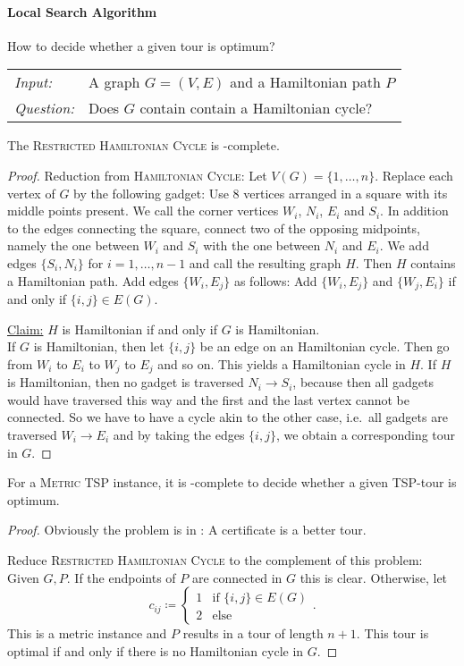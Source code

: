 \documentclass[../skript.tex]{subfiles}
\begin{document}
\paragraph{Local Search Algorithm}
How to decide whether a given tour is optimum?
\begin{problem}
\begin{tabular}{@{}ll}
\textit{Input:} & A graph $G = (V, E)$ and a Hamiltonian path $P$ \\
\textit{Question:} & Does $G$ contain contain a Hamiltonian cycle?
\end{tabular}
\end{problem}
\begin{theorem} %
\label{thm:90}
The \textsc{Restricted Hamiltonian Cycle} is \NP-complete.
\end{theorem}
\begin{proof}
Reduction from \textsc{Hamiltonian Cycle}: Let $V(G) = \{ 1, \ldots, n\}$. Replace each vertex of $G$ by the following gadget: Use 8 vertices arranged in a square with its middle points present. We call the corner vertices $W_i$, $N_i$, $E_i$ and $S_i$. In addition to the edges connecting the square, connect two of the opposing midpoints, namely the one between $W_i$ and $S_i$ with the one between $N_i$ and $E_i$. We add edges $\{ S_i, N_i \}$ for $i = 1, \ldots, n - 1$ and call the resulting graph $H$. Then $H$ contains a Hamiltonian path.
Add edges $\{ W_i, E_j \}$ as follows: Add $\{ W_i, E_j\}$ and $\{ W_j, E_i \}$ if and only if $\{ i, j\} \in E(G)$.

\underline{Claim:} $H$ is Hamiltonian if and only if $G$ is Hamiltonian. \\
If $G$ is Hamiltonian, then let $\{i, j\}$ be an edge on an Hamiltonian cycle.
Then go from $W_i$ to $E_i$ to $W_j$ to $E_j$ and so on. This yields a Hamiltonian cycle in $H$.
If $H$ is Hamiltonian, then no gadget is traversed $N_i \to S_i$, because then all gadgets would have traversed this way and the first and the last vertex cannot be connected. So we have to have a cycle akin to the other case, i.e.\ all gadgets are traversed $W_i \to E_i$ and by taking the edges $\{ i, j\}$, we obtain a corresponding tour in $G$.
\end{proof}
\begin{theorem} %
\label{thm:91}
For a \textsc{Metric TSP} instance, it is \coNP-complete to decide whether a given TSP-tour is optimum.
\end{theorem}
\begin{proof}
Obviously the problem is in \coNP: A certificate is a better tour.

Reduce \textsc{Restricted Hamiltonian Cycle} to the complement of this problem:
Given $G, P$. If the endpoints of $P$ are connected in $G$ this is clear.
Otherwise, let
\[
	c_{ij} \coloneqq \begin{cases}
	1 & \text{if } \{ i, j \} \in E(G) \\
	2 & \text{else}
	\end{cases}.
\]
This is a metric instance and $P$ results in a tour of length $n + 1$.
This tour is optimal if and only if there is no Hamiltonian cycle in $G$.
\end{proof}
\end{document}
